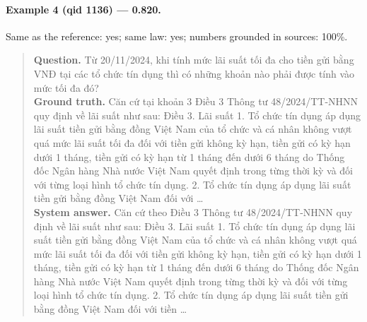 \paragraph{Example 4 (qid 1136) --- \rl{} 0.820.} Same \dieu{} as the reference: yes; same law: yes; numbers grounded in sources: 100\%.
\begin{quote}\small\textbf{Question.} Từ 20/11/2024, khi tính mức lãi suất tối đa cho tiền gửi bằng VNĐ tại các tổ chức tín dụng thì có những khoản nào phải được tính vào mức tối đa đó?\\[2pt]
\textbf{Ground truth.} Căn cứ tại khoản 3 Điều 3 Thông tư 48/2024/TT-NHNN quy định về lãi suất như sau: Điều 3. Lãi suất 1. Tổ chức tín dụng áp dụng lãi suất tiền gửi bằng đồng Việt Nam của tổ chức và cá nhân không vượt quá mức lãi suất tối đa đối với tiền gửi không kỳ hạn, tiền gửi có kỳ hạn dưới 1 tháng, tiền gửi có kỳ hạn từ 1 tháng đến dưới 6 tháng do Thống đốc Ngân hàng Nhà nước Việt Nam quyết định trong từng thời kỳ và đối với từng loại hình tổ chức tín dụng. 2. Tổ chức tín dụng áp dụng lãi suất tiền gửi bằng đồng Việt Nam đối với …\\[2pt]
\textbf{System answer.} Căn cứ theo Điều 3 Thông tư 48/2024/TT-NHNN quy định về lãi suất như sau: Điều 3. Lãi suất 1. Tổ chức tín dụng áp dụng lãi suất tiền gửi bằng đồng Việt Nam của tổ chức và cá nhân không vượt quá mức lãi suất tối đa đối với tiền gửi không kỳ hạn, tiền gửi có kỳ hạn dưới 1 tháng, tiền gửi có kỳ hạn từ 1 tháng đến dưới 6 tháng do Thống đốc Ngân hàng Nhà nước Việt Nam quyết định trong từng thời kỳ và đối với từng loại hình tổ chức tín dụng. 2. Tổ chức tín dụng áp dụng lãi suất tiền gửi bằng đồng Việt Nam đối với tiền …\end{quote}

